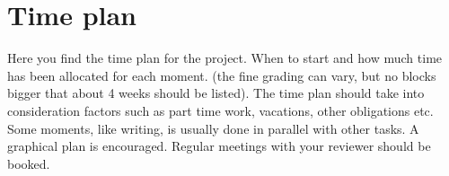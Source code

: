 \documentclass[a4paper,11pt]{article}
\begin{document}
\section{Time plan}

Here you find the time plan for the project. When to start and how much time has been allocated for each moment. (the fine grading can vary, but no blocks bigger that about 4 weeks should be listed). The time plan should take into consideration factors such as part time work, vacations, other obligations etc. Some moments, like writing, is usually done in parallel with other tasks. A graphical plan is encouraged. Regular meetings with your reviewer should be booked.



\printbibliography[heading=bibintoc]
\end{document}
